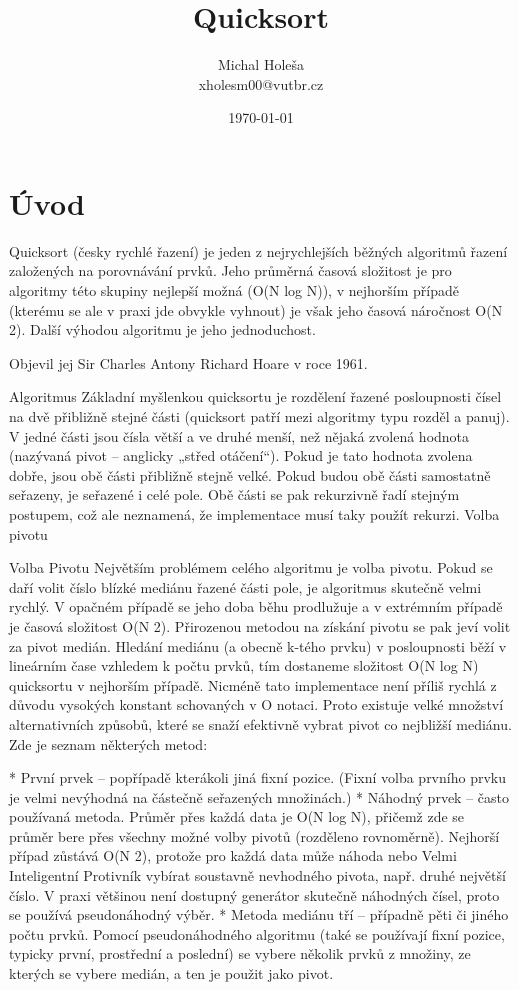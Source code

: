 \documentclass{article}
\title{Quicksort}
\author{Michal Holeša \\ xholesm00@vutbr.cz}  %
\date{\today}
\begin{document}
\maketitle


\section{Úvod}
Quicksort (česky rychlé řazení) je jeden z nejrychlejších běžných algoritmů řazení založených na porovnávání prvků. Jeho průměrná časová složitost je pro algoritmy této skupiny nejlepší možná (O(N log N)), v nejhorším případě (kterému se ale v praxi jde obvykle vyhnout) je však jeho časová náročnost O(N 2). Další výhodou algoritmu je jeho jednoduchost.

Objevil jej Sir Charles Antony Richard Hoare v roce 1961.

Algoritmus
Základní myšlenkou quicksortu je rozdělení řazené posloupnosti čísel na dvě přibližně stejné části (quicksort patří mezi algoritmy typu rozděl a panuj). V jedné části jsou čísla větší a ve druhé menší, než nějaká zvolená hodnota (nazývaná pivot – anglicky „střed otáčení“). Pokud je tato hodnota zvolena dobře, jsou obě části přibližně stejně velké. Pokud budou obě části samostatně seřazeny, je seřazené i celé pole. Obě části se pak rekurzivně řadí stejným postupem, což ale neznamená, že implementace musí taky použít rekurzi.
Volba pivotu

Volba Pivotu
Největším problémem celého algoritmu je volba pivotu. Pokud se daří volit číslo blízké mediánu řazené části pole, je algoritmus skutečně velmi rychlý. V opačném případě se jeho doba běhu prodlužuje a v extrémním případě je časová složitost O(N 2). Přirozenou metodou na získání pivotu se pak jeví volit za pivot medián. Hledání mediánu (a obecně k-tého prvku) v posloupnosti běží v lineárním čase vzhledem k počtu prvků, tím dostaneme složitost O(N log N) quicksortu v nejhorším případě. Nicméně tato implementace není příliš rychlá z důvodu vysokých konstant schovaných v O notaci. Proto existuje velké množství alternativních způsobů, které se snaží efektivně vybrat pivot co nejbližší mediánu. Zde je seznam některých metod:

* První prvek – popřípadě kterákoli jiná fixní pozice. (Fixní volba prvního prvku je velmi nevýhodná na částečně seřazených množinách.)
* Náhodný prvek – často používaná metoda. Průměr přes každá data je O(N log N), přičemž zde se průměr bere přes všechny možné volby pivotů (rozděleno rovnoměrně). Nejhorší případ zůstává O(N 2), protože pro každá data může náhoda nebo Velmi Inteligentní Protivník vybírat soustavně nevhodného pivota, např. druhé největší číslo. V praxi většinou není dostupný generátor skutečně náhodných čísel, proto se používá pseudonáhodný výběr.
* Metoda mediánu tří – případně pěti či jiného počtu prvků. Pomocí pseudonáhodného algoritmu (také se používají fixní pozice, typicky první, prostřední a poslední) se vybere několik prvků z množiny, ze kterých se vybere medián, a ten je použit jako pivot.
\end{document}
